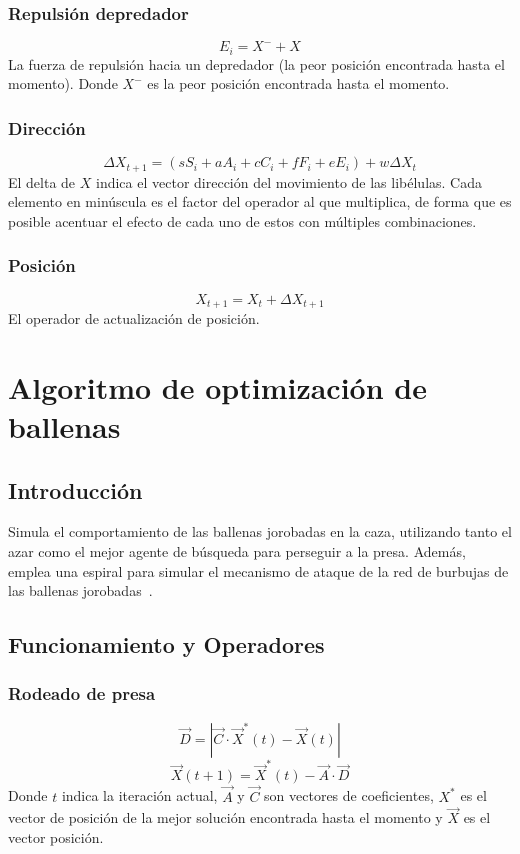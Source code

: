 \subsubsection{Repulsión depredador}
\begin{equation}
    E_i = X^- + X
\end{equation}
La fuerza de repulsión hacia un depredador (la peor posición encontrada hasta el momento). Donde $X^-$ es la peor posición encontrada hasta el momento.

\subsubsection{Dirección}
\begin{equation}
    \Delta X_{t+1} = (sS_i + aA_i + cC_i + fF_i + eE_i) + w\Delta X_t
\end{equation}
El delta de $X$ indica el vector dirección del movimiento de las libélulas. Cada elemento en minúscula es el factor del operador al que multiplica, de forma que es posible acentuar el efecto de cada uno de estos con múltiples combinaciones.

\subsubsection{Posición}
\begin{equation}
    X_{t+1} = X_{t} + \Delta X_{t+1}
\end{equation}
El operador de actualización de posición.

\section{Algoritmo de optimización de ballenas}
\subsection{Introducción}
Simula el comportamiento de las ballenas jorobadas en la caza, utilizando tanto el azar como el mejor agente de búsqueda para perseguir a la presa. Además, emplea una espiral para simular el mecanismo de ataque de la red de burbujas de las ballenas jorobadas~\cite{mirjalili_whale_2016}.

\subsection{Funcionamiento y Operadores}
\subsubsection{Rodeado de presa}
\begin{equation}
    \vec{D}=|\vec{C}\cdot\vec{X}^*(t)-\vec{X}(t)|
\end{equation}
\begin{equation}
    \vec{X}(t+1)=\vec{X}^*(t)-\vec{A}\cdot\vec{D}
\end{equation}
Donde $t$ indica la iteración actual, $\vec{A}$ y $\vec{C}$ son vectores de coeficientes, $X^*$ es el vector de posición de la mejor solución encontrada hasta el momento y $\vec{X}$ es el vector posición.


